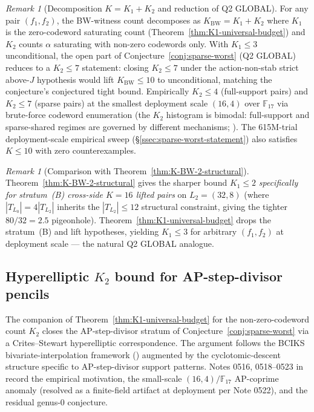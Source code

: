 \documentclass[11pt]{article}
\theoremstyle{definition}
\theoremstyle{remark}
\newtheorem{remark}[theorem]{Remark}
\newcommand{\FF}{\mathbb{F}}
\begin{document}
\begin{remark}[Decomposition $K = K_1 + K_2$ and reduction of Q2 GLOBAL]
\label{rem:K1-K2-decomposition}
For any pair $(f_1, f_2)$, the BW-witness count decomposes as
$K_{\mathrm{BW}} = K_1 + K_2$ where $K_1$ is the zero-codeword
saturating count (Theorem~\ref{thm:K1-universal-budget}) and $K_2$ counts
$\alpha$ saturating with non-zero codewords only. With $K_1 \leq 3$
unconditional, the open part of Conjecture~\ref{conj:sparse-worst}
(Q2 GLOBAL) reduces to a $K_2 \leq 7$ statement: closing $K_2 \leq 7$
under the action-non-stab strict above-$J$ hypothesis would lift
$K_{\mathrm{BW}} \leq 10$ to unconditional, matching the conjecture's
conjectured tight bound. Empirically $K_2 \leq 4$ (full-support pairs)
and $K_2 \leq 7$ (sparse pairs) at the smallest deployment scale
$(16, 4)$ over $\FF_{17}$ via brute-force codeword enumeration (the
$K_2$ histogram is bimodal: full-support and sparse-shared regimes
are governed by different mechanisms; \cite{CompanionRepo}). The 615M-trial
deployment-scale empirical sweep (\S\ref{ssec:sparse-worst-statement})
also satisfies $K \leq 10$ with zero counterexamples.
\end{remark}

\begin{remark}[Comparison with Theorem~\ref{thm:K-BW-2-structural}]
\label{rem:K1-universal-vs-stratumB}
Theorem~\ref{thm:K-BW-2-structural} gives the sharper bound $K_1 \leq 2$
\emph{specifically for stratum~(B) cross-side $K = 16$ lifted pairs} on
$L_2 = (32, 8)$ (where $|T_{L_0}| = 4 |T_{L_2}|$ inherits the
$|T_{L_2}| \leq 12$ structural constraint, giving the tighter
$80/32 = 2.5$ pigeonhole). Theorem~\ref{thm:K1-universal-budget} drops
the stratum~(B) and lift hypotheses, yielding $K_1 \leq 3$ for arbitrary
$(f_1, f_2)$ at deployment scale --- the natural Q2 GLOBAL analogue.
\end{remark}

\subsection{Hyperelliptic $K_2$ bound for AP-step-divisor pencils}
\label{ssec:K2-hyperelliptic}

\noindent The companion of Theorem~\ref{thm:K1-universal-budget} for
the non-zero-codeword count $K_2$ closes the AP-step-divisor stratum
of Conjecture~\ref{conj:sparse-worst} via a Crites--Stewart hyperelliptic
correspondence. The argument follows the BCIKS bivariate-interpolation
framework (\cite{BCIKS}) augmented by the cyclotomic-descent structure
specific to AP-step-divisor support patterns. Notes 0516, 0518--0523 in
\cite{CompanionRepo} record the empirical motivation, the small-scale
$(16, 4)/\FF_{17}$ AP-coprime anomaly (resolved as a finite-field
artifact at deployment per Note 0522), and the residual genus-0
conjecture.
\end{document}
